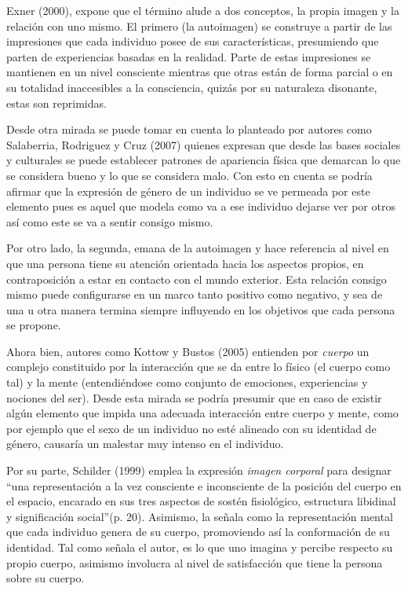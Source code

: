 Exner (2000), expone que el término alude a dos conceptos, la propia imagen y la
relación con uno mismo.
El primero (la autoimagen) se construye a partir de las impresiones que cada
individuo posee de sus características, presumiendo que parten de experiencias
basadas en la realidad.
Parte de estas impresiones se mantienen en un nivel consciente mientras que
otras están de forma parcial o en su totalidad inaccesibles a la consciencia,
quizás por su naturaleza disonante, estas son reprimidas.

Desde otra mirada se puede tomar en cuenta lo planteado por autores como
Salaberria, Rodriguez y Cruz (2007) quienes expresan que desde las bases
sociales y culturales se puede establecer patrones de apariencia física que
demarcan lo que se considera bueno y lo que se considera malo.
Con esto en cuenta se podría afirmar que la expresión de género de un individuo
se ve permeada por este elemento pues es aquel que modela como va a ese
individuo dejarse ver por otros así como este se va a sentir consigo mismo.

Por otro lado, la segunda, emana de la autoimagen y hace referencia al nivel en
que una persona tiene su atención orientada hacia los aspectos propios, en
contraposición a estar en contacto con el mundo exterior.
Esta relación consigo mismo puede configurarse en un marco tanto positivo como
negativo, y sea de una u otra manera termina siempre influyendo en los objetivos
que cada persona se propone.

Ahora bien, autores como Kottow y Bustos (2005) entienden por \emph{cuerpo}  un
complejo constituido por la interacción que se da entre lo físico (el cuerpo
como tal) y la mente (entendiéndose como conjunto de emociones, experiencias y
nociones del ser).
Desde esta mirada se podría presumir que en caso de existir algún elemento que
impida una adecuada interacción entre cuerpo y mente, como por ejemplo que el
sexo de un individuo no esté alineado con su identidad de género, causaría un
malestar muy intenso en el individuo.

Por su parte, Schilder (1999) emplea la expresión \emph{imagen corporal} para designar
“una representación a la vez consciente e inconsciente de la posición del cuerpo
en el espacio, encarado en sus tres aspectos de sostén fisiológico, estructura
libidinal y significación social”(p. 20).
Asimismo, la señala como la representación  mental que cada individuo genera de
su cuerpo, promoviendo así la conformación de su identidad.
Tal como señala el autor, es lo que uno imagina y percibe respecto su propio
cuerpo, asimismo involucra al nivel de satisfacción que tiene la persona sobre
su cuerpo.

